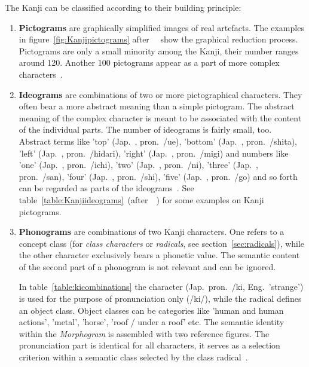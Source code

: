 The Kanji can be classified according to their building principle:
\begin{enumerate}
 \item \textbf{Pictograms} are graphically simplified images of real artefacts.
       The examples in figure~\ref{fig:Kanjipictograms} 
       after~~\citeyear{Kano1990} show the graphical 
       reduction process. Pictograms are only a small minority among the Kanji,
       their number ranges around 120. Another 100 pictograms appear as a part of
       more complex characters~.
       
 \item \textbf{Ideograms} are combinations of two or more pictographical
       characters. They often bear a more abstract meaning than a simple 
       pictogram. The abstract meaning of the complex character is meant to be 
       associated with the content of the individual parts. The number of 
       ideograms is fairly small, too. Abstract terms like 
       'top' (Jap.\ , pron.\ /ue), 
       'bottom' (Jap.\ , pron.\ /shita),
       'left' (Jap.\ , pron.\ /hidari),
       'right' (Jap.\ , pron.\ /migi)
       and numbers like
       'one' (Jap.\ , pron.\ /ichi),
       'two' (Jap.\ , pron.\ /ni),
       'three' (Jap.\ , pron.\ /san),
       'four' (Jap.\ , pron.\ /shi),
       'five' (Jap.\ , pron.\ /go)
       and so forth can be regarded as parts of the 
       ideograms~.
       See table~\ref{table:Kanjiideograms}\ (after~~\citeyear{Kano1990}) for 
       some examples on Kanji pictograms.

 \item \textbf{Phonograms} are combinations of two Kanji characters. One
       refers to a concept class (for \emph{class characters} or \emph{radicals},
       see section~\ref{sec:radicals}), 
       while the other character exclusively bears a phonetic value. The 
       semantic content of the second part of a phonogram is not relevant 
       and can be ignored.

       In table~\ref{table:kicombinations} the character 
        (Jap.\ pron.\ /ki, Eng.\ 'strange') is used for the purpose
       of pronunciation only (/ki/), while the radical defines an
       object class. Object classes can be categories like 'human and human 
       actions', 'metal', 'horse', 'roof / under a roof' etc.
       The semantic identity within the \emph{Morphogram} is assembled with two
       reference figures. The pronunciation part is identical for all characters,
       it serves as a selection criterion within a semantic class selected by 
       the class radical~.

\end{enumerate}

